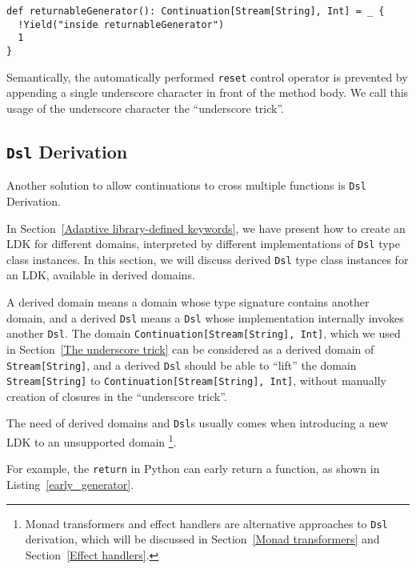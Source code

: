 \begin{lstlisting}[caption={Returning an additional value in LDK-based generators, written in the underscore trick},label={returnableGenerator-underscore}]
def returnableGenerator(): Continuation[Stream[String], Int] = _ {
  !Yield("inside returnableGenerator")
  1
}
\end{lstlisting}

Semantically, the automatically performed \lstinline{reset} control operator is prevented by appending a single underscore character in front of the method body. We call this usage of the underscore character the ``underscore trick''.

\subsection{\lstinline{Dsl} Derivation}\label{Composable delimited continuation}

Another solution to allow continuations to cross multiple functions is \lstinline{Dsl} Derivation.

In Section~\ref{Adaptive library-defined keywords}, we have present how to create an LDK for different domains, interpreted by different implementations of \lstinline{Dsl} type class instances. In this section, we will discuss derived \lstinline{Dsl} type class instances for an LDK, available in derived domains.

A derived domain means a domain whose type signature contains another domain, and a derived \lstinline{Dsl} means a \lstinline{Dsl} whose implementation internally invokes another \lstinline{Dsl}. The domain \lstinline{Continuation[Stream[String], Int]}, which we used in Section~\ref{The underscore trick} can be considered as a derived domain of \lstinline{Stream[String]}, and a derived \lstinline{Dsl} should be able to ``lift'' the domain \lstinline{Stream[String]} to \lstinline{Continuation[Stream[String], Int]}, without manually creation of closures in the ``underscore trick''.

The need of derived domains and \lstinline{Dsl}s usually comes when introducing a new LDK to an unsupported domain \footnote{Monad transformers and effect handlers are alternative approaches to \lstinline{Dsl} derivation, which will be discussed in Section~\ref{Monad transformers} and Section~\ref{Effect handlers}.}.

For example, the \lstinline{return} in Python can early return a function, as shown in Listing~\ref{early_generator}.


